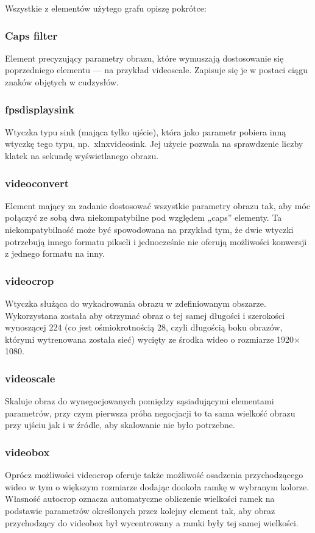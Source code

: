 \documentclass[12pt, oneside]{article}
\begin{document}
Wszystkie z elementów użytego grafu opiszę pokrótce:

\subsubsection{Caps filter}
Element precyzujący parametry obrazu, które wymuszają
dostosowanie się poprzedniego elementu --- na przykład videoscale.
Zapisuje się je w postaci ciągu znaków objętych w cudzysłów.

\subsubsection{fpsdisplaysink}
Wtyczka typu sink (mająca tylko ujście), która jako parametr
pobiera inną wtyczkę tego typu, np.~xlnxvideosink. Jej użycie
pozwala na sprawdzenie liczby klatek na sekundę wyświetlanego
obrazu.

\subsubsection{videoconvert}
Element mający za zadanie dostosować wszystkie parametry obrazu tak,
aby móc połączyć ze sobą dwa niekompatybilne pod względem „caps” elementy.
Ta niekompatybilność może być spowodowana na przykład tym, że dwie
wtyczki potrzebują innego formatu pikseli i jednocześnie nie oferują
możliwości konwersji z jednego formatu na inny.

\subsubsection{videocrop}
Wtyczka służąca do wykadrowania obrazu w zdefiniowanym obszarze.
Wykorzystana została aby otrzymać obraz o tej samej długości
i szerokości wynoszącej 224 (co jest ośmiokrotnością 28, czyli
długością boku obrazów, którymi wytrenowana została sieć) wycięty
ze środka wideo o rozmiarze 1920\(\times \)1080.

\subsubsection{videoscale}
Skaluje obraz do wynegocjowanych pomiędzy sąsiadującymi elementami
parametrów, przy czym pierwsza próba negocjacji to ta sama wielkość
obrazu przy ujściu jak i w źródle, aby skalowanie nie było potrzebne.

\subsubsection{videobox}
Oprócz możliwości videocrop oferuje także możliwość osadzenia
przychodzącego wideo w tym o większym rozmiarze dodając dookoła ramkę
w wybranym kolorze. Własność autocrop oznacza automatyczne obliczenie
wielkości ramek na podstawie parametrów określonych przez kolejny element tak,
aby obraz przychodzący do videobox był wycentrowany a ramki
były tej samej wielkości.
\end{document}
